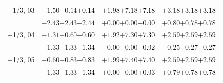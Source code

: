 \documentclass[compress]{beamer}
\begin{document}
\begin{frame}
\begin{tabular}{r | c | c | c}
$+$1/3, 03 & $-1.50$\hspace{0.1 cm}$+0.14$\hspace{0.1 cm}\textcolor{black}{$+0.14$} & $+1.98$\hspace{0.1 cm}$+7.18$\hspace{0.1 cm}\textcolor{black}{$+7.18$} & $+3.18$\hspace{0.1 cm}$+3.18$\hspace{0.1 cm}\textcolor{black}{$+3.18$} \\
           & $-2.43$\hspace{0.1 cm}$-2.43$\hspace{0.1 cm}\textcolor{black}{$-2.44$} & $+0.00$\hspace{0.1 cm}$+0.00$\hspace{0.1 cm}\textcolor{black}{$-0.00$} & $+0.80$\hspace{0.1 cm}$+0.78$\hspace{0.1 cm}\textcolor{black}{$+0.78$} \\
$+$1/3, 04 & $-1.31$\hspace{0.1 cm}$-0.60$\hspace{0.1 cm}\textcolor{black}{$-0.60$} & $+1.92$\hspace{0.1 cm}$+7.30$\hspace{0.1 cm}\textcolor{black}{$+7.30$} & $+2.59$\hspace{0.1 cm}$+2.59$\hspace{0.1 cm}\textcolor{black}{$+2.59$} \\
           & $-1.33$\hspace{0.1 cm}$-1.33$\hspace{0.1 cm}\textcolor{black}{$-1.34$} & $-0.00$\hspace{0.1 cm}$-0.00$\hspace{0.1 cm}\textcolor{black}{$-0.02$} & $-0.25$\hspace{0.1 cm}$-0.27$\hspace{0.1 cm}\textcolor{black}{$-0.27$} \\
$+$1/3, 05 & $-0.60$\hspace{0.1 cm}$-0.83$\hspace{0.1 cm}\textcolor{black}{$-0.83$} & $+1.99$\hspace{0.1 cm}$+7.40$\hspace{0.1 cm}\textcolor{black}{$+7.40$} & $+2.59$\hspace{0.1 cm}$+2.59$\hspace{0.1 cm}\textcolor{black}{$+2.59$} \\
           & $-1.33$\hspace{0.1 cm}$-1.33$\hspace{0.1 cm}\textcolor{black}{$-1.34$} & $+0.00$\hspace{0.1 cm}$-0.00$\hspace{0.1 cm}\textcolor{black}{$+0.03$} & $+0.79$\hspace{0.1 cm}$+0.78$\hspace{0.1 cm}\textcolor{black}{$+0.78$} \\

\end{tabular}
\end{frame}
\end{document}
